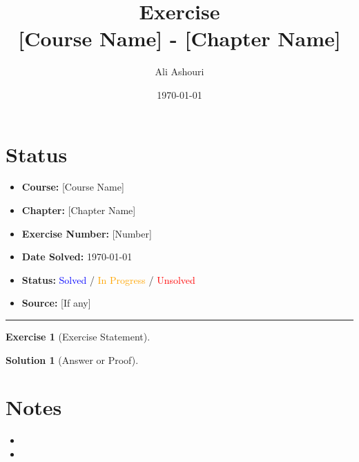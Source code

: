 \documentclass[a4paper,12pt]{article}
\title{%
	\Huge \textbf{Exercise} \\[0.3cm]
	\Large [Course Name] - [Chapter Name]
}
\author{Ali Ashouri}
\date{\today}
\theoremstyle{plain}
\newtheorem{exercise}{Exercise}
\newtheorem{solution}{Solution}
\begin{document}
	
	\maketitle
	
	\section*{Status}
	\begin{itemize}
		\item \textbf{Course:} [Course Name]
		\item \textbf{Chapter:} [Chapter Name]
		\item \textbf{Exercise Number:} [Number]
		\item \textbf{Date Solved:} \today
		\item \textbf{Status:} \textcolor{blue}{Solved} / \textcolor{orange}{In Progress} / \textcolor{red}{Unsolved}
		\item \textbf{Source:} [If any]
	\end{itemize}
	\rule{\textwidth}{0.4pt}
	
	\begin{exercise}
		[Exercise Statement]
	\end{exercise}
	
	\begin{solution}
		[Answer or Proof]
	\end{solution}
	
	\section*{Notes}
	\begin{itemize}
		\item [Note 1]
		\item [Note 2]
	\end{itemize}
	
\end{document}
